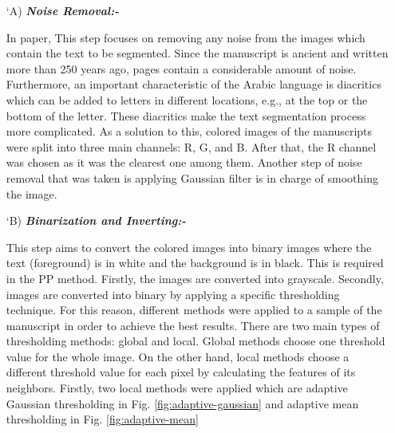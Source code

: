 \begin{itemize}[labelindent=1em,labelsep=0.25cm,leftmargin=*]
        \item[\char `A)] \textit{\textbf{Noise Removal:-}} 
       
        In paper, \cite{Shams2020} This step focuses on removing any noise from the images
        which contain the text to be segmented. 
        Since the manuscript is ancient and written more than 250
        years ago, pages contain a considerable amount of noise.
        Furthermore, an important characteristic of the Arabic language is
        diacritics which can be added to letters in different locations,
        e.g., at the top or the bottom of the letter. These diacritics make
        the text segmentation process more complicated. As a solution
        to this, colored images of the manuscripts were split into three
        main channels: R, G, and B. After that, the R channel was
        chosen as it was the clearest one among them.
        Another step of noise removal that was taken is applying
        Gaussian filter is in charge of smoothing the image.
        \item[\char `B)] \textit{\textbf{Binarization and Inverting:-}}
        
        This step aims to convert the colored images into binary
        images where the text (foreground) is in white and the background is in black. This is required in the PP method.
        Firstly, the images are converted into grayscale. Secondly,
        images are converted into binary by applying a specific
        thresholding technique. For this reason, different methods were
        applied to a sample of the manuscript in order to achieve the
        best results. There are two main types of thresholding methods: global and local. Global methods choose one threshold value for the whole image. On the other hand, local methods choose
        a different threshold value for each pixel by calculating the
        features of its neighbors. Firstly, two local methods were
        applied which are adaptive Gaussian thresholding in 
        Fig. \ref{fig:adaptive-gaussian} and adaptive mean thresholding in Fig. \ref{fig:adaptive-mean} 
        

\end{itemize}
